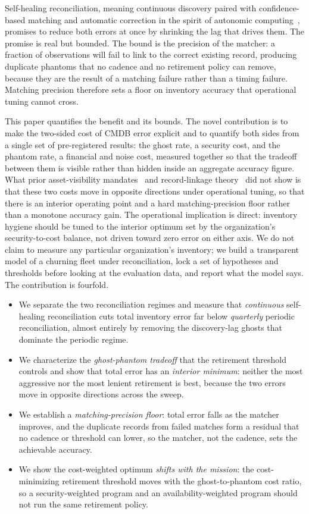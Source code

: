 \documentclass[journal]{IEEEtran}
\begin{document}
Self-healing reconciliation, meaning continuous discovery paired with confidence-based matching and
automatic correction in the spirit of autonomic computing~\cite{kephart2003vision}, promises to
reduce both errors at once by shrinking the lag that drives them. The promise is real but bounded.
The bound is the precision of the matcher: a fraction of observations will fail to link to the
correct existing record, producing duplicate phantoms that no cadence and no retirement policy can
remove, because they are the result of a matching failure rather than a timing failure. Matching
precision therefore sets a floor on inventory accuracy that operational tuning cannot cross.

This paper quantifies the benefit and its bounds. The novel contribution is to make the two-sided cost
of CMDB error explicit and to quantify both sides from a single set of pre-registered results: the
ghost rate, a security cost, and the phantom rate, a financial and noise cost, measured together so
that the tradeoff between them is visible rather than hidden inside an aggregate accuracy figure. What
prior asset-visibility mandates~\cite{nist80053,cisabod2301} and record-linkage
theory~\cite{fellegi1969linkage,christen2012matching} did not show is that these two costs move in
opposite directions under operational tuning, so that there is an interior operating point and a hard
matching-precision floor rather than a monotone accuracy gain. The operational implication is direct:
inventory hygiene should be tuned to the interior optimum set by the organization's security-to-cost
balance, not driven toward zero error on either axis. We do not claim to measure any particular
organization's inventory; we build a transparent model of a churning fleet under reconciliation,
lock a set of hypotheses and thresholds before looking at the evaluation data, and report what the
model says. The contribution is fourfold.

\begin{itemize}
\item We separate the two reconciliation regimes and measure that \emph{continuous} self-healing
reconciliation cuts total inventory error far below \emph{quarterly} periodic reconciliation, almost
entirely by removing the discovery-lag ghosts that dominate the periodic regime.
\item We characterize the \emph{ghost-phantom tradeoff} that the retirement threshold controls and
show that total error has an \emph{interior minimum}: neither the most aggressive nor the most
lenient retirement is best, because the two errors move in opposite directions across the sweep.
\item We establish a \emph{matching-precision floor}: total error falls as the matcher improves, and
the duplicate records from failed matches form a residual that no cadence or threshold can lower, so
the matcher, not the cadence, sets the achievable accuracy.
\item We show the cost-weighted optimum \emph{shifts with the mission}: the cost-minimizing
retirement threshold moves with the ghost-to-phantom cost ratio, so a security-weighted program and
an availability-weighted program should not run the same retirement policy.
\end{itemize}
\end{document}
